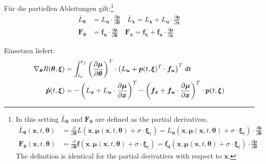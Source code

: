\documentclass[a4paper, 12pt]{scrartcl}
\newcommand{\dt}{\thinspace \mathsf{dt}}
\begin{document}
Für die partiellen Ableitungen gilt:\footnote{
    In this setting $\bar{L}_{\bm{\theta}}$ and $\bm{F}_{\bm{\theta}}$ 
    are defined as the partial derivatives.
    \begin{align*}
        \bar{L}_{\bm{\theta}}(\bm{x},t,\bm{\theta})
        &=
        \frac{\partial}{\partial \bm{\theta}}
        L(\bm{x},\bm{\mu}(\bm{x},t, \bm{\theta}) + \sigma \cdot \bm{\xi}_t)
        =
        L_{\bm{u}}(\bm{x},\bm{\mu}(\bm{x},t, \bm{\theta}) + \sigma \cdot \bm{\xi}_t) 
        \cdot
        \frac{\partial \bm{\mu}}{\partial \bm{\theta}}
        \\
        \bm{F}_{\bm{\theta}}(\bm{x},t,\bm{\theta})
        &=
        \frac{\partial}{\partial \bm{\theta}}
        \bm{f}(\bm{x},\bm{\mu}(\bm{x},t, \bm{\theta}) + \sigma \cdot \bm{\xi}_t)
        =
        \bm{f}_{\bm{u}}(\bm{x},\bm{\mu}(\bm{x},t, \bm{\theta}) + \sigma \cdot \bm{\xi}_t) 
        \cdot
        \frac{\partial \bm{\mu}}{\partial \bm{\theta}}
    \end{align*}
    The definition is identical for 
    the partial derivatives with respect to $\bm{x}$.
}
\begin{align*}
    \bar{L}_{\bm{\theta}}
    &=
    L_{\bm{u}}
    \cdot
    \frac{\partial \bm{\mu}}{\partial \bm{\theta}}
    \quad
    \bar{L}_{\bm{x}}
    =
    L_{\bm{x}} + L_{\bm{u}} \cdot \frac{\partial \bm{\mu}}{\partial \bm{x}}
    \\
    \bm{F}_{\bm{\theta}}
    &=
    \bm{f}_{\bm{u}}
    \cdot
    \frac{\partial \bm{\mu}}{\partial \bm{\theta}}
    \quad
    \bm{F}_{\bm{x}}
    =
    \bm{f}_{\bm{x}} + \bm{f}_{\bm{u}} 
    \cdot 
    \frac{\partial \bm{\mu}}{\partial \bm{x}}
\end{align*}

Einsetzen liefert:
\begin{align*}
    \nabla_{\bm{\theta}}
    R(\bm{\theta}, \bm{\xi})
    &=
    \int_{t_0}^{t_f} 
    \left(
        \frac{\partial \bm{\mu}}{\partial \bm{\theta}}
    \right)^T
    \cdot
    \left(
        L_{\bm{u}}
        +
        \bm{p}(t,\bm{\xi})^T
        \cdot
        \bm{f}_{\bm{u}}
    \right)^T
    \dt
    \\
    \bm{\dot{p}}(t,\bm{\xi})
    &=
    -
    \left(
        L_{\bm{x}} + L_{\bm{u}} \cdot \frac{\partial \bm{\mu}}{\partial \bm{x}}
    \right)^T
    -
    \left(
        \bm{f}_{\bm{x}} + \bm{f}_{\bm{u}} 
        \cdot 
        \frac{\partial \bm{\mu}}{\partial \bm{x}}
    \right)^T
    \cdot 
    \bm{p}(t,\bm{\xi})
\end{align*}
\end{document}

